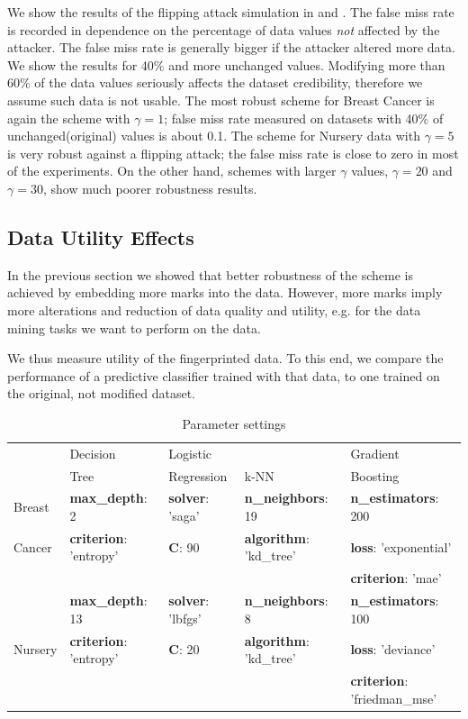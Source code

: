 \documentclass[runningheads]{llncs}
\begin{document}
We show the results of the flipping attack simulation in  and . The false miss rate is recorded in dependence on the percentage of data values \textit{not} affected by the attacker. 
The false miss rate is generally bigger if the attacker altered more data. 
We show the results for 40\% and more unchanged values. 
Modifying more than 60\% of the data values seriously affects the dataset credibility, therefore we assume such data is not usable.
The most robust scheme for Breast Cancer is again the scheme with $\gamma=1$; false miss rate measured on datasets with 40\% of unchanged(original) values is about 0.1.
The scheme for Nursery data with $\gamma=5$ is very robust against a flipping attack; the false miss rate is close to zero in most of the experiments. On the other hand, schemes with larger $\gamma$ values, $\gamma=20$ and $\gamma=30$, show much poorer robustness results.

\subsection{Data Utility Effects}\label{sec:utility}
In the previous section we showed that better robustness of the scheme is achieved by embedding more marks into the data. 
However, more marks imply more alterations and reduction of data quality and utility, e.g. for the data mining tasks we want to perform on the data.

We thus measure utility of the fingerprinted data. To this end, we compare the performance of a predictive classifier trained with that data, to one trained on the original, not modified dataset. 
\begin{table}[ht]
    \centering
    \caption{Parameter settings}
    \begin{tabular}{@{}l|llll@{}}
     \toprule
         & Decision & Logistic  &  & Gradient\\
         & Tree & Regression & k-NN & Boosting \\
         \midrule
         Breast & \textbf{max\_depth}: 2 & \textbf{solver}: 'saga' & \textbf{n\_neighbors}: 19 & \textbf{n\_estimators}: 200 \\
         Cancer & \textbf{criterion}: 'entropy' & \textbf{C}: 90 &  \textbf{algorithm}: 'kd\_tree' & \textbf{loss}: 'exponential'\\
         &&&& \textbf{criterion}: 'mae'\\
         \hline
         &\textbf{max\_depth}: 13 & \textbf{solver}: 'lbfgs' & \textbf{n\_neighbors}: 8 & \textbf{n\_estimators}: 100 \\
        Nursery & \textbf{criterion}: 'entropy' & \textbf{C}: 20 &  \textbf{algorithm}: 'kd\_tree' & \textbf{loss}: 'deviance' \\
        &&&& \textbf{criterion}: 'friedman\_mse'\\
        \bottomrule
    \end{tabular}
    \label{tab:parameter-setting}
\end{table}
\end{document}
